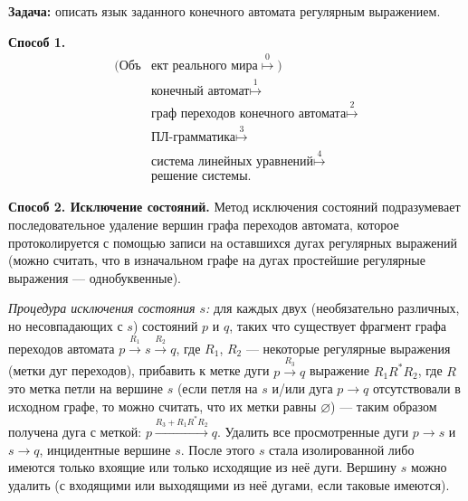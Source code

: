 
\textbf{Задача:} описать язык заданного конечного автомата регулярным
выражением.

\textbf{Способ 1.}
\begin{equation*} 
\begin{split}
\text{(Объ} &\text{ект реального мира}
\stackrel{0}{\mapsto})\\ 
&\text{конечный автомат}
\stackrel{1}{\mapsto}\\
&\text{граф переходов конечного автомата}
\stackrel{2}{\mapsto}\\
&\text{ПЛ-грамматика} 
\stackrel{3}{\mapsto}\\
&\text{система линейных уравнений}
\stackrel{4}{\mapsto}\\
&\text{решение системы.}
\end{split}
\end{equation*} 

\textbf{Способ 2. Исключение состояний.}
Метод исключения состояний подразумевает последовательное удаление вершин графа
переходов автомата, которое протоколируется с помощью записи на оставшихся дугах
регулярных выражений (можно считать, что в изначальном графе на дугах
простейшие регулярные выражения — однобуквенные).

\emph{Процедура исключения состояния $s$:} для каждых двух (необязательно
различных, но несовпадающих с $s$) состояний $p$ и $q$, таких что существует
фрагмент графа переходов автомата $p \xrightarrow{R_1} s \xrightarrow{R_2} q$,
где $R_1$, $R_2$ — некоторые регулярные выражения (метки дуг переходов),
прибавить к метке дуги $p \xrightarrow{R_3} q$ выражение $R_1R^{\ast}R_2$, где
$R$ это метка петли на вершине $s$ (если петля на $s$ и/или дуга $p \to q$
отсутствовали в исходном графе, то можно считать, что их метки равны
$\varnothing$) — таким образом получена дуга с меткой: $p \xrightarrow{R_3 +
R_1R^{\ast}R_2} q$. Удалить все просмотренные дуги $p \to s$ и $s \to q$,
инцидентные вершине $s$. После этого $s$ стала изолированной либо имеются только
вхоящие или только исходящие из неё дуги. Вершину $s$ можно удалить (с
входящими или выходящими из неё дугами, если таковые имеются).

